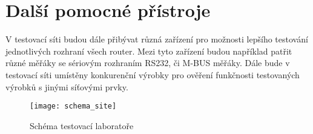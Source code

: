 \section{Další pomocné přístroje}
V testovací síti budou dále přibývat různá zařízení pro možnosti lepšího testování jednotlivých rozhraní všech router. Mezi tyto zařízení budou například patřit různé měřáky se sériovým rozhraním RS232, či M-BUS měřáky. Dále bude v testovací síti umístěny konkurenční výrobky pro ověření funkčnosti testovaných výrobků s jinými síťovými prvky.

\begin{figure}[h]
  \centering
  \texttt{[image: schema\_site]}
  \caption{Schéma testovací laboratoře}
  \label{fig:schema_site}
\end{figure}

\endinput
